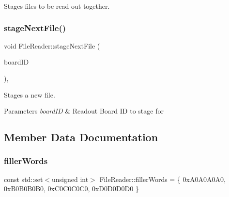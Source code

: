 Stages files to be read out together. 

\mbox{\label{class_file_reader_ad4d5d927c5d9ceb26bba7ec1f6c60737}} 
\subsubsection{\texorpdfstring{stage\+Next\+File()}{stageNextFile()}}
{\footnotesize\ttfamily void File\+Reader\+::stage\+Next\+File (\begin{DoxyParamCaption}\item[{const \hyperlink{class_board_identifier}{Board\+Identifier} \&}]{board\+ID }\end{DoxyParamCaption})\hspace{0.3cm}{\ttfamily [inline]}, {\ttfamily [private]}}



Stages a new file. 


\begin{DoxyParams}{Parameters}
{\em board\+ID} & Readout Board ID to stage for \\
\hline
\end{DoxyParams}


\subsection{Member Data Documentation}
\mbox{\label{class_file_reader_a7a0bb5e7cb117f6a415f005665893509}} 
\subsubsection{\texorpdfstring{filler\+Words}{fillerWords}}
{\footnotesize\ttfamily const std\+::set$<$unsigned int$>$ File\+Reader\+::filler\+Words = \{ 0x\+A0\+A0\+A0\+A0, 0x\+B0\+B0\+B0\+B0, 0x\+C0\+C0\+C0\+C0, 0x\+D0\+D0\+D0\+D0 \}\hspace{0.3cm}{\ttfamily [private]}}

\mbox{\label{class_file_reader_ac9ec812e6d9fbd7014cf0b4fc69557f9}} 
